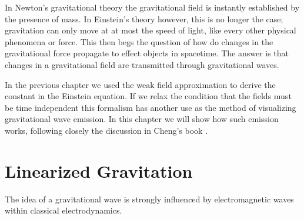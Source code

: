 
In Newton's gravitational theory the gravitational field is instantly established by the presence of mass. In Einstein's theory however, this is no longer the case; gravitation can only move at at most the speed of light, like every other physical phenomena or force. This then begs the question of how do changes in the gravitational force propagate to effect objects in spacetime. The answer is that changes in a gravitational field are transmitted through gravitational waves.

In the previous chapter we used the weak field approximation to derive the constant in the Einstein equation. If we relax the condition that the fields must be time independent this formalism has another use as the method of visualizing gravitational wave emission. In this chapter we will show how such emission works, following closely the discussion in Cheng's book \cite{cheng}.

\section{Linearized Gravitation}

The idea of a gravitational wave is strongly influenced by electromagnetic waves within classical electrodynamics.

